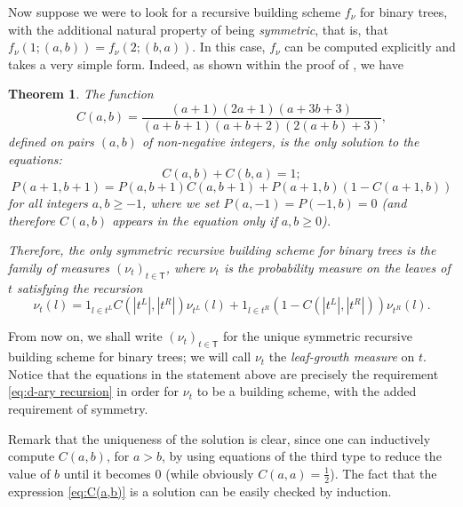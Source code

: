 \documentclass[11pt]{article}
\renewcommand{\geq}{\geqslant}
\newcommand{\sT}{\mathsf{T}} %
\newtheorem{thm}{Theorem}[section]
\begin{document}
Now suppose we were to look for a recursive building scheme $f_\nu$ for binary trees, with the additional natural property of being \emph{symmetric}, that is, that $f_\nu(1;(a,b))=f_\nu(2; (b,a))$. In this case, $f_\nu$ can be computed explicitly and takes a very simple form. Indeed, as shown within the proof of \cite[Proposition 5.1]{CS20}, we have

\begin{thm}\label{thm:defmeasurediscrete}The function
\begin{equation}\label{eq:C(a,b)}C(a,b)=\frac{(a+1)(2a+1)(a+3b+3)}{(a+b+1)(a+b+2)(2(a+b)+3)},\end{equation}
defined on pairs $(a,b)$ of non-negative integers, is the only solution to the equations:
\[C(a,b)+C(b,a)=1;\]
\[P(a+1,b+1)=P(a,b+1)C(a,b+1)+P(a+1,b)(1-C(a+1,b))\]
for all integers $a,b\geq -1$, where we set $P(a,-1)=P(-1,b)=0$ (and therefore $C(a,b)$ appears in the equation only if $a,b\geq 0$).

Therefore, the only symmetric recursive building scheme for binary trees is the family of measures $(\nu_t)_{t\in \sT}$, where $\nu_t$ is the probability measure on the leaves of $t$ satisfying the recursion
\begin{equation}\nu_t(l)=1_{l\in t^L}C(|t^L|,|t^R|)\nu_{t^L}(l)+1_{l\in t^R}(1-C(|t^L|,|t^R|))\nu_{t^R}(l).\label{recursion with C's}\end{equation}
\end{thm}

From now on, we shall write $(\nu_t)_{t\in \sT}$ for the unique symmetric recursive building scheme for binary trees; we will call $\nu_t$ the \emph{leaf-growth measure} on $t$. Notice that the equations in the statement above are precisely the requirement \eqref{eq:d-ary recursion} in order for $\nu_t$ to be a building scheme, with the added requirement of symmetry.

Remark that the uniqueness of the solution is clear, since one can inductively compute $C(a,b)$, for $a>b$, by using equations of the third type to reduce the value of $b$ until it becomes $0$ (while obviously $C(a,a)=\frac12$). The fact that the expression \eqref{eq:C(a,b)} is a solution can be easily checked by induction.

\end{document}
